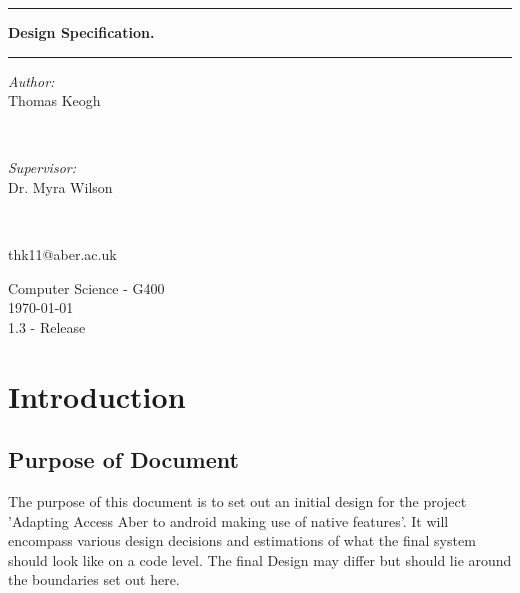 \documentclass[10pt,a4paper]{article}
\begin{document}
\begin{titlepage}
\center
\hrule
\vspace{0.3cm}

\huge
\textbf{  Design Specification.}
\vspace{0.3cm}
\hrule
\vspace{0.6cm}
\large

\begin{minipage}{0.4\textwidth}
\begin{flushleft} \large
\emph{Author:}\\
Thomas Keogh %
\end{flushleft}
\end{minipage}
~
\begin{minipage}{0.4\textwidth}
\begin{flushright} \large
\emph{Supervisor:} \\
Dr. Myra Wilson %
\end{flushright}
\end{minipage}\\

 \vspace{1cm}

 thk11@aber.ac.uk




\vspace{1cm}


\vspace{0.1cm}

Computer Science - G400
\\
\vspace{0.1cm}
\today \\
\vspace{0.1cm}
1.3 - Release
\end{titlepage}
\newpage
\tableofcontents
\newpage
\section{Introduction}
\subsection{Purpose of Document}
The purpose of this document is to set out an initial design for the project 'Adapting Access Aber to android making use of native features'. It will encompass various design decisions and estimations of what the final system should look like on a code level. The final Design may differ but should lie around the boundaries set out here.
\end{document}
